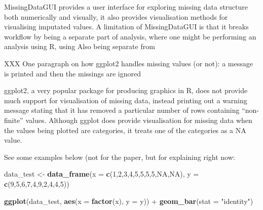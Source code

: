 \documentclass[]{article}
\newenvironment{Shaded}{\begin{snugshade}}{\end{snugshade}}
\newcommand{\KeywordTok}[1]{\textcolor[rgb]{0.13,0.29,0.53}{\textbf{{#1}}}}
\newcommand{\DataTypeTok}[1]{\textcolor[rgb]{0.13,0.29,0.53}{{#1}}}
\newcommand{\DecValTok}[1]{\textcolor[rgb]{0.00,0.00,0.81}{{#1}}}
\newcommand{\StringTok}[1]{\textcolor[rgb]{0.31,0.60,0.02}{{#1}}}
\newcommand{\OtherTok}[1]{\textcolor[rgb]{0.56,0.35,0.01}{{#1}}}
\newcommand{\NormalTok}[1]{{#1}}
\begin{document}
MissingDataGUI provides a user interface for exploring missing data
structure both numerically and visually, it also provides visualisation
methods for visualising imputated values. A limitation of MissingDataGUI
is that it breaks workflow by being a separate part of analysis, where
one might be performing an analysis using R, using Also being separate
from

XXX One paragraph on how ggplot2 handles missing values (or not): a
message is printed and then the missings are ignored

ggplot2, a very popular package for producing graphics in R, does not
provide much support for visualisation of missing data, instead printing
out a warning message stating that it has removed a particular number of
rows containing ``non-finite'' values. Although ggplot does provide
visualisation for missing data when the values being plotted are
categories, it treats one of the categories as a NA value.

See some examples below (not for the paper, but for explaining right
now:

\begin{Shaded}
\begin{Highlighting}[]
\NormalTok{data_test <-}\StringTok{ }\KeywordTok{data_frame}\NormalTok{(}\DataTypeTok{x =} \KeywordTok{c}\NormalTok{(}\DecValTok{1}\NormalTok{,}\DecValTok{2}\NormalTok{,}\DecValTok{3}\NormalTok{,}\DecValTok{4}\NormalTok{,}\DecValTok{5}\NormalTok{,}\DecValTok{5}\NormalTok{,}\DecValTok{5}\NormalTok{,}\DecValTok{5}\NormalTok{,}\OtherTok{NA}\NormalTok{,}\OtherTok{NA}\NormalTok{),}
                        \DataTypeTok{y =} \KeywordTok{c}\NormalTok{(}\DecValTok{9}\NormalTok{,}\DecValTok{5}\NormalTok{,}\DecValTok{6}\NormalTok{,}\DecValTok{7}\NormalTok{,}\DecValTok{4}\NormalTok{,}\DecValTok{9}\NormalTok{,}\DecValTok{2}\NormalTok{,}\DecValTok{4}\NormalTok{,}\DecValTok{4}\NormalTok{,}\DecValTok{5}\NormalTok{))}

  \KeywordTok{ggplot}\NormalTok{(data_test,}
         \KeywordTok{aes}\NormalTok{(}\DataTypeTok{x =} \KeywordTok{factor}\NormalTok{(x),}
             \DataTypeTok{y =} \NormalTok{y)) +}\StringTok{ }
\StringTok{  }\KeywordTok{geom_bar}\NormalTok{(}\DataTypeTok{stat =} \StringTok{"identity"}\NormalTok{)}
\end{Highlighting}
\end{Shaded}
\end{document}
